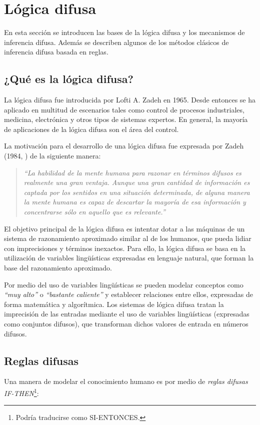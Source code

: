 \chapter{Lógica difusa}
\label{cha:logica-difusa}
En esta sección se introducen las bases de la lógica difusa y los mecanismos de inferencia difusa. Además se describen algunos de los métodos clásicos de inferencia difusa basada en reglas.

\section{¿Qué es la lógica difusa?}
La lógica difusa fue introducida por Lofti A. Zadeh en 1965. Desde entonces se ha aplicado en multitud de escenarios tales como control de procesos industriales, medicina, electrónica y otros tipos de sistemas expertos. En general, la mayoría de aplicaciones de la lógica difusa son el área del control.

La motivación para el desarrollo de una lógica difusa fue expresada por Zadeh (1984, \cite{Zadeh1984}) de la siguiente manera:
\begin{quote}
\emph{``La habilidad de la mente humana para razonar en términos difusos es realmente una gran ventaja. Aunque una gran cantidad de información es captada por los sentidos en una situación determinada, de alguna manera la mente humana es capaz de descartar la mayoría de esa información y concentrarse sólo en aquello que es relevante.''}
\end{quote}
El objetivo principal de la lógica difusa es intentar dotar a las máquinas de un sistema de razonamiento aproximado similar al de los humanos, que pueda lidiar con imprecisiones y términos inexactos. Para ello, la lógica difusa se basa en la utilización de variables lingüísticas expresadas en lenguaje natural, que forman la base del razonamiento aproximado. 

Por medio del uso de variables lingüísticas se pueden modelar conceptos como \emph{``muy alto''} o \emph{``bastante caliente''} y establecer relaciones entre ellos, expresadas de forma matemática y algorítmica. Los sistemas de lógica difusa tratan la imprecisión de las entradas mediante el uso de variables lingüísticas (expresadas como conjuntos difusos), que transforman dichos valores de entrada en números difusos.

\section{Reglas difusas}
Una manera de modelar el conocimiento humano es por medio de \emph{reglas difusas IF-THEN}\footnote{Podría traducirse como SI-ENTONCES.}:

